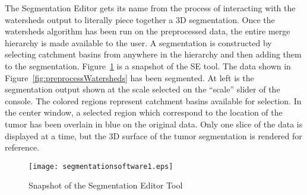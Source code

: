 The Segmentation Editor gets its name from the process of interacting with the
watersheds output to literally piece together a 3D segmentation.  Once the
watersheds algorithm has been run on the preprocessed data, the entire merge
hierarchy is made available to the user.  A segmentation is constructed by
selecting catchment basins from anywhere in the hierarchy and then adding them
to the segmentation.  Figure~\ref{fig:editingWatersheds} is a snapshot of the
SE tool.  The data shown in Figure~\ref{fig:preprocessWatersheds} has been
segmented.  At left is the segmentation output shown at the scale selected on
the ``scale'' slider of the console.  The colored regions represent catchment
basins available for selection.  In the center window, a selected region which
correspond to the location of the tumor has been overlain in blue on the
original data.  Only one slice of the data is displayed at a time, but the
3D surface of the tumor segmentation is rendered for reference.

\begin{figure}
\centering
\texttt{[image: segmentationsoftware1.eps]}
\caption{Snapshot of the Segmentation Editor Tool}
\protect\label{fig:editingWatersheds}
\end{figure}

